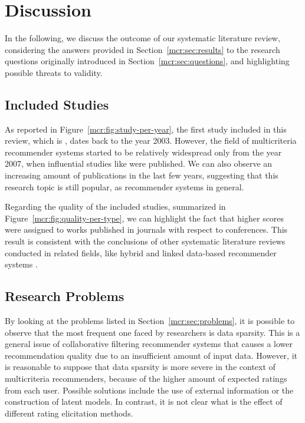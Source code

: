 \section{Discussion}
\label{mcr:sec:discussion}

In the following, we discuss the outcome of our systematic literature review, considering the answers provided in Section~\ref{mcr:sec:results} to the research questions originally introduced in Section~\ref{mcr:sec:questions}, and highlighting possible threats to validity.

\subsection{Included Studies}

As reported in Figure~\ref{mcr:fig:study-per-year}, the first study included in this review, which is , dates back to the year 2003. However, the field of multicriteria recommender systems started to be relatively widespread only from the year 2007, when influential studies like  were published. We can also observe an increasing amount of publications in the last few years, suggesting that this research topic is still popular, as recommender systems in general.

Regarding the quality of the included studies, summarized in Figure~\ref{mcr:fig:quality-per-type}, we can highlight the fact that higher scores were assigned to works published in journals with respect to conferences. This result is consistent with the conclusions of other systematic literature reviews conducted in related fields, like hybrid and linked data-based recommender systems \cite{Cano2017,Figueroa2015}.

\subsection{Research Problems}

By looking at the problems listed in Section~\ref{mcr:sec:problems}, it is possible to observe that the most frequent one faced by researchers is data sparsity. This is a general issue of collaborative filtering recommender systems that causes a lower recommendation quality due to an insufficient amount of input data. However, it is reasonable to suppose that data sparsity is more severe in the context of multicriteria recommenders, because of the higher amount of expected ratings from each user. Possible solutions include the use of external information or the construction of latent models. In contrast, it is not clear what is the effect of different rating elicitation methods.

